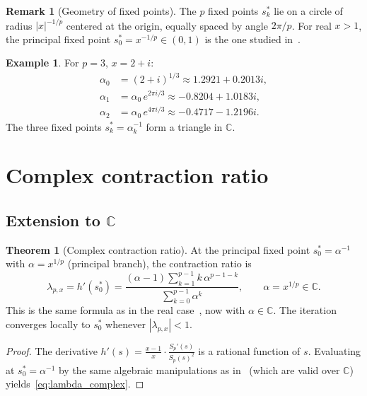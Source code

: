 \documentclass[11pt,a4paper]{article}
\theoremstyle{definition}
\newtheorem{theorem}{Theorem}[section]
\newtheorem{remark}{Remark}[section]
\newtheorem{example}{Example}[section]
\newcommand{\CC}{\mathbb{C}}
\begin{document}
\begin{remark}[Geometry of fixed points]
The $p$ fixed points $s_k^*$ lie on a circle of radius $|x|^{-1/p}$ centered at the origin, equally spaced by angle $2\pi/p$.  For real $x > 1$, the principal fixed point $s_0^* = x^{-1/p} \in (0,1)$ is the one studied in~\cite{besevic2026}.
\end{remark}

\begin{example}
For $p = 3$, $x = 2+i$:
\begin{align*}
  \alpha_0 &= (2+i)^{1/3} \approx 1.2921 + 0.2013i, \\
  \alpha_1 &= \alpha_0 \, e^{2\pi i/3} \approx -0.8204 + 1.0183i, \\
  \alpha_2 &= \alpha_0 \, e^{4\pi i/3} \approx -0.4717 - 1.2196i.
\end{align*}
The three fixed points $s_k^* = \alpha_k^{-1}$ form a triangle in $\CC$.
\end{example}

\section{Complex contraction ratio}
\label{sec:complex_lambda}

\subsection{Extension to \texorpdfstring{$\CC$}{C}}

\begin{theorem}[Complex contraction ratio]
\label{thm:complex_lambda}
At the principal fixed point $s_0^* = \alpha^{-1}$ with $\alpha = x^{1/p}$ (principal branch), the contraction ratio is
\begin{equation}
  \label{eq:lambda_complex}
  \lambda_{p,x} = h'(s_0^*) = \frac{(\alpha - 1)\displaystyle\sum_{k=1}^{p-1} k\,\alpha^{p-1-k}}{\displaystyle\sum_{k=0}^{p-1} \alpha^k},
  \qquad \alpha = x^{1/p} \in \CC.
\end{equation}
This is the same formula as in the real case~\cite{besevic2026}, now with $\alpha \in \CC$.  The iteration converges locally to $s_0^*$ whenever $|\lambda_{p,x}| < 1$.
\end{theorem}

\begin{proof}
The derivative $h'(s) = \frac{x-1}{x} \cdot \frac{S_p'(s)}{S_p(s)^2}$ is a rational function of $s$.  Evaluating at $s_0^* = \alpha^{-1}$ by the same algebraic manipulations as in~\cite{besevic2026} (which are valid over $\CC$) yields~\eqref{eq:lambda_complex}.
\end{proof}
\end{document}
